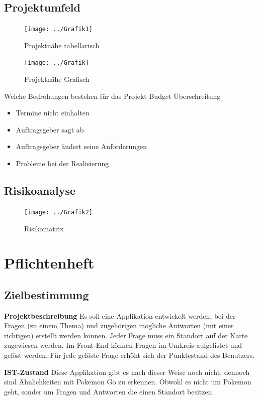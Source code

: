 \subsection{Projektumfeld}

\begin{figure}
	\centering
	\texttt{[image: ../Grafik1]}
	\caption{Projektnähe tabellarisch}
	\label{fig:grafik1}
\end{figure}


\begin{figure}
	\centering
	\texttt{[image: ../Grafik]}
	\caption{Projektnähe Grafisch}
	\label{fig:grafik}
\end{figure}




Welche Bedrohungen bestehen für das Projekt
Budget Überschreitung
\begin{itemize}
	\item Termine nicht einhalten
	\item Auftragsgeber sagt ab
	\item Auftragsgeber ändert seine Anforderungen
	\item Probleme bei der Realisierung
\end{itemize}



\subsection{Risikoanalyse}
\begin{figure}
	\centering
	\texttt{[image: ../Grafik2]}
	\caption{Risikomatrix}
	\label{fig:grafik2}
\end{figure}

\section{Pflichtenheft}
\subsection{Zielbestimmung}

\textbf {Projektbeschreibung}
 Es soll eine Applikation entwickelt werden, bei der Fragen (zu einem Thema) und zugehörigen mögliche Antworten (mit einer richtigen) erstellt werden können. Jeder Frage muss ein Standort auf der Karte zugewiesen werden.
Im Front-End können Fragen im Umkreis aufgelistet und gelöst werden. Für jede gelöste Frage erhöht sich der Punktestand des Benutzers.

\textbf {IST-Zustand}
Diese Applikation gibt es nach dieser Weise noch nicht, dennoch sind Ähnlichkeiten mit Pokemon Go zu erkennen. Obwohl es nicht um Pokemon geht, sonder um Fragen und Antworten die einen Standort besitzen.


